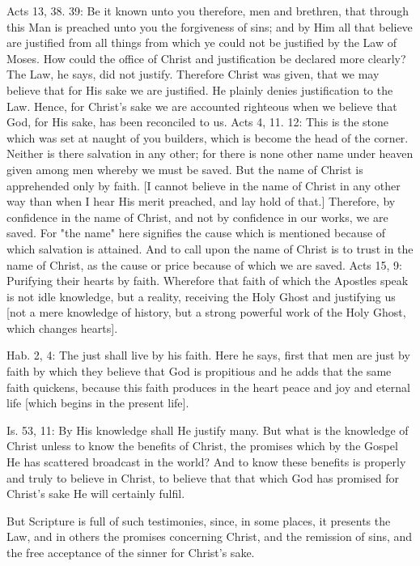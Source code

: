 Acts 13, 38. 39: Be it known unto you therefore, men and brethren,
that through this Man is preached unto you the forgiveness of sins;
and by Him all that believe are justified from all things from which
ye could not be justified by the Law of Moses.  How could the office
of Christ and justification be declared more clearly?  The Law, he
says, did not justify.  Therefore Christ was given, that we may
believe that for His sake we are justified.  He plainly denies
justification to the Law.  Hence, for Christ's sake we are accounted
righteous when we believe that God, for His sake, has been reconciled
to us.  Acts 4, 11. 12: This is the stone which was set at naught of
you builders, which is become the head of the corner.  Neither is
there salvation in any other; for there is none other name under
heaven given among men whereby we must be saved.  But the name of
Christ is apprehended only by faith.  [I cannot believe in the name
of Christ in any other way than when I hear His merit preached, and
lay hold of that.] Therefore, by confidence in the name of Christ,
and not by confidence in our works, we are saved.  For "the name"
here signifies the cause which is mentioned because of which
salvation is attained.  And to call upon the name of Christ is to
trust in the name of Christ, as the cause or price because of which
we are saved.  Acts 15, 9: Purifying their hearts by faith.
Wherefore that faith of which the Apostles speak is not idle
knowledge, but a reality, receiving the Holy Ghost and justifying us
[not a mere knowledge of history, but a strong powerful work of the
Holy Ghost, which changes hearts].

Hab. 2, 4: The just shall live by his faith.  Here he says, first
that men are just by faith by which they believe that God is
propitious and he adds that the same faith quickens, because this
faith produces in the heart peace and joy and eternal life [which
begins in the present life].

Is. 53, 11: By His knowledge shall He justify many.  But what is the
knowledge of Christ unless to know the benefits of Christ, the
promises which by the Gospel He has scattered broadcast in the world?
And to know these benefits is properly and truly to believe in
Christ, to believe that that which God has promised for Christ's sake
He will certainly fulfil.

But Scripture is full of such testimonies, since, in some places, it
presents the Law, and in others the promises concerning Christ, and
the remission of sins, and the free acceptance of the sinner for
Christ's sake.

